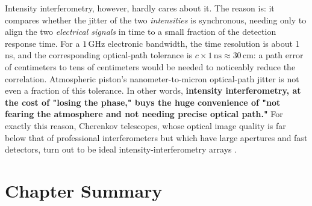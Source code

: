 Intensity interferometry, however, hardly cares about it. The reason is: it compares whether the jitter of the two \emph{intensities} is synchronous, needing only to align the two \emph{electrical signals} in time to a small fraction of the detection response time. For a \(1\,\mathrm{GHz}\) electronic bandwidth, the time resolution is about 1 ns, and the corresponding optical-path tolerance is \(c\times1\,\mathrm{ns}\approx30\,\mathrm{cm}\): a path error of centimeters to tens of centimeters would be needed to noticeably reduce the correlation. Atmospheric piston's nanometer-to-micron optical-path jitter is not even a fraction of this tolerance. In other words, \textbf{intensity interferometry, at the cost of "losing the phase," buys the huge convenience of "not fearing the atmosphere and not needing precise optical path."} For exactly this reason, Cherenkov telescopes, whose optical image quality is far below that of professional interferometers but which have large apertures and fast detectors, turn out to be ideal intensity-interferometry arrays \citep{2006ApJ...649..399L,2024MNRAS.529.4387A}.

\section{Chapter Summary}
\label{sec:e10-summary}

